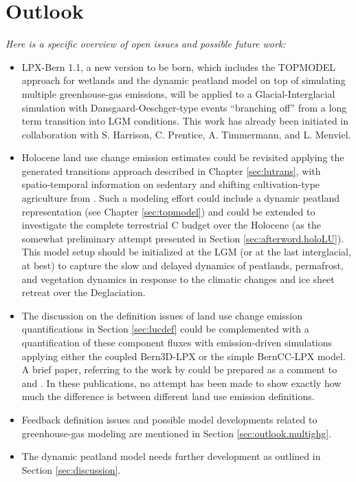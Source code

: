 \chapter*{Outlook}
{\it Here is a specific overview of open issues and possible future work: }
\begin{itemize}
\item LPX-Bern 1.1, a new version to be born, which includes the TOPMODEL
  approach for wetlands and the dynamic peatland model on top of
  simulating multiple greenhouse-gas emissions, will be applied to a
  Glacial-Interglacial simulation with Dansgaard-Oeschger-type events
  ``branching off'' from a long term transition into LGM
  conditions. This work has already been initiated in collaboration
  with S. Harrison, C. Prentice, A. Timmermann, and L. Menviel.
\item Holocene land use change emission estimates could be revisited applying
  the generated transitions approach described in Chapter
  \ref{sec:lutrans}, with spatio-temporal information on sedentary and
  shifting cultivation-type agriculture from
  \citet{olofssonhickler2008}%
  . Such a modeling effort could include
  a dynamic peatland representation (see Chapter \ref{sec:topmodel})
  and could be extended to investigate the complete terrestrial C budget
  over the Holocene (as the somewhat preliminary attempt presented in
  Section \ref{sec:afterword.holoLU}). This model setup should
  be initialized at the LGM (or at the last interglacial, at best) to capture the slow and delayed dynamics of
  peatlands, permafrost, and vegetation dynamics in response to the
  climatic changes and ice sheet retreat over the Deglaciation. 
\item The discussion on the definition issues of land use change
  emission quantifications in Section \ref{sec:lucdef} could be
  complemented with a quantification of these component fluxes with
  emission-driven simulations applying either the coupled Bern3D-LPX
  or the simple BernCC-LPX model. A brief paper, referring to the work by
  \citet{strassmann08tel} could be prepared as a comment to
  \citet{gasserciais13} and \citet{pongratz13}. In these publications, no
  attempt has been made to show exactly how much the difference is
  between different land use emission definitions.
\item Feedback definition issues and possible model developments related to
  greenhouse-gas modeling are mentioned in Section
  \ref{sec:outlook.multighg}.
\item The dynamic peatland model needs further development as
  outlined in Section \ref{sec:discussion}.
\end{itemize}

